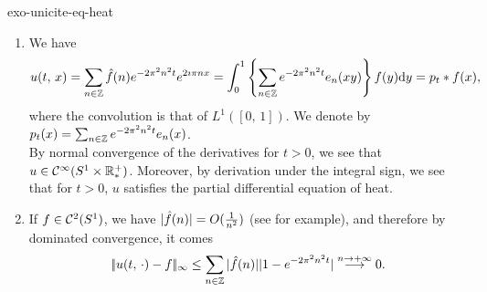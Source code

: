  
\begin{correction}{exo-unicite-eq-heat}
\begin{enumerate}
\item We have
\begin{equation*}
u (t, \, x) = \sum_{n \in \mathbb{Z}}{\hat{f} (n) e^{- 2 \pi^2n^2 t} e^{2 \imath \pi nx}} = \int_0^1{\left\{\sum_{n \in \mathbb{Z}}{e^{- 2 \pi^2n^2 t} e_n (xy)} \right\} f(y) \mathrm{d} y} = p_t * f(x),
\end{equation*}
where the convolution is that of $ L^1 ([0, \, 1]) $. We denote by $ p_t (x) = \sum_{n \in \mathbb{Z}}{e^{- 2 \pi^2n^2 t} e_n (x)} $. \\By normal convergence of the derivatives for $ t> 0 $, we see that $ u \in \mathcal{C}^\infty(S^1 \times \mathbb{R}_*^+) $. Moreover, by derivation under the integral sign, we see that for $ t> 0 $, $ u $ satisfies the partial differential equation of heat.
\item If $ f \in \mathcal{C}^2 (S^1) $, we have $ | \hat{f} (n) | = O(\tfrac{1}{n^2}) $ (see \cite{zq} for example), and therefore by dominated convergence, it comes
\begin{equation*}
|\!| u (t, \, \cdot) - f |\!|_{\infty} \leq \sum_{n \in \mathbb{Z}}{| \hat{f} (n) | | 1-e^{- 2 \pi^2n^2 t} |} \overset{n \to +\infty}{\longrightarrow} 0.
\end{equation*}
 

\end{enumerate}
\end{correction}
